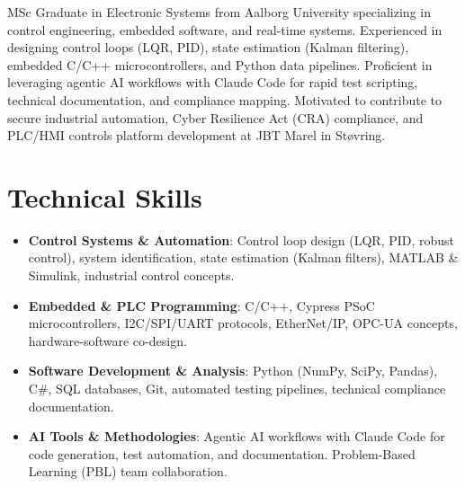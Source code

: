 \documentclass[11pt,a4paper,sans]{moderncv}
\begin{document}
\makecvtitle


\vspace{6pt}
\small{MSc Graduate in Electronic Systems from Aalborg University specializing in control engineering, embedded software, and real-time systems. Experienced in designing control loops (LQR, PID), state estimation (Kalman filtering), embedded C/C++ microcontrollers, and Python data pipelines. Proficient in leveraging agentic AI workflows with Claude Code for rapid test scripting, technical documentation, and compliance mapping. Motivated to contribute to secure industrial automation, Cyber Resilience Act (CRA) compliance, and PLC/HMI controls platform development at JBT Marel in Støvring.}


\section{Technical Skills}
\vspace{1pt}
\begin{itemize}

\item \textbf{Control Systems \& Automation}: Control loop design (LQR, PID, robust control), system identification, state estimation (Kalman filters), MATLAB \& Simulink, industrial control concepts.

\item \textbf{Embedded \& PLC Programming}: C/C++, Cypress PSoC microcontrollers, I2C/SPI/UART protocols, EtherNet/IP, OPC-UA concepts, hardware-software co-design.

\item \textbf{Software Development \& Analysis}: Python (NumPy, SciPy, Pandas), C\#, SQL databases, Git, automated testing pipelines, technical compliance documentation.

\item \textbf{AI Tools \& Methodologies}: Agentic AI workflows with Claude Code for code generation, test automation, and documentation. Problem-Based Learning (PBL) team collaboration.

\end{itemize}

\end{document}
